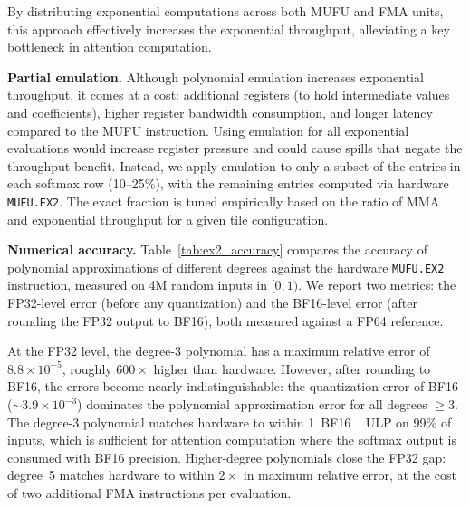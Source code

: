 By distributing exponential computations across both MUFU and FMA units, this approach effectively increases the exponential throughput, alleviating a key bottleneck in attention computation.

\textbf{Partial emulation.}
Although polynomial emulation increases exponential throughput, it comes at a cost: additional registers (to hold intermediate values and coefficients), higher register bandwidth consumption, and longer latency compared to the MUFU instruction. Using emulation for all exponential evaluations would increase register pressure and could cause spills that negate the throughput benefit. Instead, we apply emulation to only a subset of the entries in each softmax row (10--25\%), with the remaining entries computed via hardware \texttt{MUFU.EX2}. The exact fraction is tuned empirically based on the ratio of MMA and exponential throughput for a given tile configuration.

\textbf{Numerical accuracy.}
Table~\ref{tab:ex2_accuracy} compares the accuracy of polynomial approximations of different degrees against the hardware \texttt{MUFU.EX2} instruction, measured on 4M random inputs in $[0, 1)$. We report two metrics: the FP32-level error (before any quantization) and the BF16-level error (after rounding the FP32 output to BF16), both measured against a FP64 reference.

At the FP32 level, the degree-3 polynomial has a maximum relative error of $8.8 \times 10^{-5}$, roughly $600\times$ higher than hardware. However, after rounding to BF16, the errors become nearly indistinguishable: the quantization error of BF16 (${\sim}3.9 \times 10^{-3}$) dominates the polynomial approximation error for all degrees $\geq 3$. The degree-3 polynomial matches hardware to within 1~BF16 ~ ULP on 99\% of inputs, which is sufficient for attention computation where the softmax output is consumed with BF16 precision.
Higher-degree polynomials close the FP32 gap: degree~5 matches hardware to within $2\times$ in maximum relative error, at the cost of two additional FMA instructions per evaluation.

